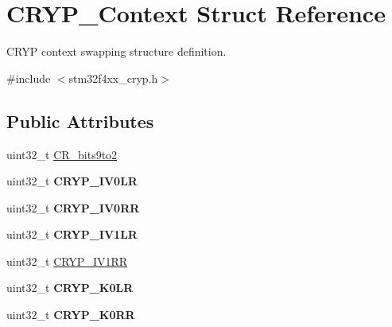 \hypertarget{struct_c_r_y_p___context}{}\section{C\+R\+Y\+P\+\_\+\+Context Struct Reference}
\label{struct_c_r_y_p___context}


C\+R\+Y\+P context swapping structure definition.  




{\ttfamily \#include $<$stm32f4xx\+\_\+cryp.\+h$>$}

\subsection*{Public Attributes}
\begin{DoxyCompactItemize}
\item 
uint32\+\_\+t \hyperlink{struct_c_r_y_p___context_ad8cccfe37789c5a9054cbe8a7164d897}{C\+R\+\_\+bits9to2}
\item 
\hypertarget{struct_c_r_y_p___context_af926fa464ab0fc37594ddd79169d9cd0}{}uint32\+\_\+t {\bfseries C\+R\+Y\+P\+\_\+\+I\+V0\+L\+R}\label{struct_c_r_y_p___context_af926fa464ab0fc37594ddd79169d9cd0}

\item 
\hypertarget{struct_c_r_y_p___context_ad77ea3171d87c278b42b984a6c308943}{}uint32\+\_\+t {\bfseries C\+R\+Y\+P\+\_\+\+I\+V0\+R\+R}\label{struct_c_r_y_p___context_ad77ea3171d87c278b42b984a6c308943}

\item 
\hypertarget{struct_c_r_y_p___context_a05a18344be993efec4b12d61b2281009}{}uint32\+\_\+t {\bfseries C\+R\+Y\+P\+\_\+\+I\+V1\+L\+R}\label{struct_c_r_y_p___context_a05a18344be993efec4b12d61b2281009}

\item 
uint32\+\_\+t \hyperlink{struct_c_r_y_p___context_aafdd5ed6c7cafe8f45aabc5401501bf7}{C\+R\+Y\+P\+\_\+\+I\+V1\+R\+R}
\item 
\hypertarget{struct_c_r_y_p___context_a487ca545522aeb881483717c16bcbc06}{}uint32\+\_\+t {\bfseries C\+R\+Y\+P\+\_\+\+K0\+L\+R}\label{struct_c_r_y_p___context_a487ca545522aeb881483717c16bcbc06}

\item 
\hypertarget{struct_c_r_y_p___context_adbf073d605f7a85eda04a306f65ad195}{}uint32\+\_\+t {\bfseries C\+R\+Y\+P\+\_\+\+K0\+R\+R}\label{struct_c_r_y_p___context_adbf073d605f7a85eda04a306f65ad195}


\end{DoxyCompactItemize}
